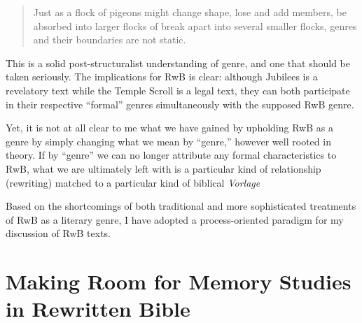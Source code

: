 \begin{quote}
Just as a flock of pigeons might change shape, lose and add members, be
absorbed into larger flocks of break apart into several smaller flocks,
genres and their boundaries are not static.\autocite[277]{zahn_jbl2012}
\end{quote}

This is a solid post-structuralist understanding of genre, and one that
should be taken seriously. The implications for RwB is clear: although
Jubilees is a revelatory text while the Temple Scroll is a legal text,
they can both participate in their respective ``formal'' genres
simultaneously with the supposed RwB genre.\autocites[Zahn also explores
the ``functional'' aspects of genre. She notes that genres are ``not
simply systems of classifications developed and used by literary
critics, but are fundamental to all human
communication.''][280]{zahn_jbl2012}[Thus, genres manifest as common
patterns recognized by both the author and the reader which aid
communication and in this way, genre functions as a sort of ``literary
body language.''][276]{zahn_jbl2012}[See
also][199]{newsome_grossman2010}

Yet, it is not at all clear to me what we have gained by upholding RwB
as a genre by simply changing what we mean by ``genre,'' however well
rooted in theory.\autocite[Machiela critiques Zahn's approach for
similar reasons. See][]{machiela_jjs2010} If by ``genre'' we can no
longer attribute any formal characteristics to RwB, what we are
ultimately left with is a particular kind of relationship (rewriting)
matched to a particular kind of biblical \emph{Vorlage}

Based on the shortcomings of both traditional and more sophisticated
treatments of RwB as a literary genre, I have adopted a process-oriented
paradigm for my discussion of RwB texts.\autocite[I am in broad
agreement with Campbell's treatment of the matter.
See][64--67]{campbell_zsengeller2014}

\section{Making Room for Memory Studies in
Rewritten Bible}\label{making-room-for-memory-studies-in-rwb}
